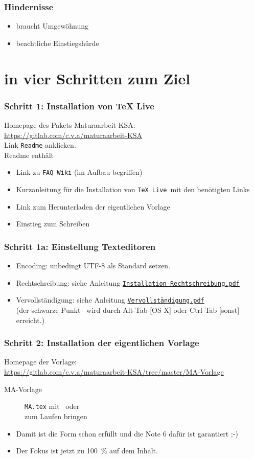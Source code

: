 \documentclass[11pt,german]{beamer}
\def\myColor{blue!80!white!70!green}                %
\newcommand{\thisColor}[1]{{\color{\myColor}#1}}    %
\newcommand{\grey}[1]{{\color{black!60}#1}}         %
\newcommand{\tttc}[1]{{\tt\thisColor{#1}}}          %
\newcommand{\ttgr}[1]{{\tt\grey{#1}}}               %
\newcommand{\smallurl}[1]{{\scriptsize{\url{#1}}}}
\begin{document}
\frame
{
	\frametitle{Hindernisse}
\begin{itemize}
	\item braucht Umgewöhnung
	\item beachtliche Einstiegshürde
\end{itemize}


}
\section{in vier Schritten zum Ziel}
\frame
{
	\frametitle{Schritt 1: Installation von TeX Live}
	
	Homepage des Pakets Maturaarbeit KSA: \\
	\smallurl{https://gitlab.com/c.v.a/maturaarbeit-KSA} \\
	
	Link \ttgr{Readme} anklicken.\\
	\vspace{2ex}
	Readme enthält
	
	\begin{itemize}
		\item Link zu \ttgr{FAQ Wiki} (im Aufbau begriffen)
		\item Kurzanleitung für die Installation von \tttc{TeX Live}\ mit den benötigten Links
		\item Link zum Herunterladen der eigentlichen Vorlage
		\item Einstieg zum Schreiben
	\end{itemize}
	
}
\frame
{
	\frametitle{Schritt 1a: Einstellung Texteditoren}
	\begin{itemize}
		\item Encoding: unbedingt UTF-8 als Standard setzen.
		\item Rechtschreibung: siehe Anleitung \href{run:Installation-Rechtschreibung.pdf}{\tttc{Installation-Rechtschreibung.pdf}}
		\item Vervollständigung: siehe Anleitung \href{run:Vervollständigung.pdf}{\tttc {Vervollständigung.pdf}}\\
		(der schwarze Punkt \textbullet\ wird durch Alt-Tab $[$OS X$]$ oder Ctrl-Tab $[$sonst$]$ erreicht.)
	\end{itemize}
}
\frame
{
	\frametitle{Schritt 2: Installation der eigentlichen Vorlage}
	
	
	Homepage der Vorlage: \\
	\smallurl{https://gitlab.com/c.v.a/maturaarbeit-KSA/tree/master/MA-Vorlage}\\
	
			\begin{description}
 				\item[MA-Vorlage] {\tt{MA.tex}} mit \thisColor{\XeTeX}\ oder \thisColor{\XeLaTeX}\\ zum Laufen bringen
			\end{description}
	\begin{itemize}
		\item Damit ist die Form schon erfüllt und die Note 6 dafür ist garantiert ;-)
		\item Der Fokus ist jetzt zu \SI{100}{\percent} auf dem Inhalt.
	\end{itemize}
}
\end{document}
